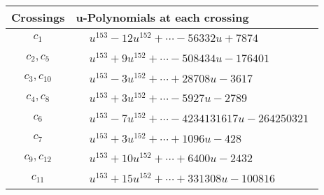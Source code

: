 \documentclass[1p]{elsarticle_modified}
\theoremstyle{definition}
\begin{document}
\begin{tabular}{m{50pt}|m{274pt}}
Crossings & \hspace{64pt}u-Polynomials at each crossing \\
\hline $$\begin{aligned}c_{1}\end{aligned}$$&$\begin{aligned}
&u^{153}-12 u^{152}+\cdots-56332 u+7874
\end{aligned}$\\
\hline $$\begin{aligned}c_{2},c_{5}\end{aligned}$$&$\begin{aligned}
&u^{153}+9 u^{152}+\cdots-508434 u-176401
\end{aligned}$\\
\hline $$\begin{aligned}c_{3},c_{10}\end{aligned}$$&$\begin{aligned}
&u^{153}-3 u^{152}+\cdots+28708 u-3617
\end{aligned}$\\
\hline $$\begin{aligned}c_{4},c_{8}\end{aligned}$$&$\begin{aligned}
&u^{153}+3 u^{152}+\cdots-5927 u-2789
\end{aligned}$\\
\hline $$\begin{aligned}c_{6}\end{aligned}$$&$\begin{aligned}
&u^{153}-7 u^{152}+\cdots-4234131617 u-264250321
\end{aligned}$\\
\hline $$\begin{aligned}c_{7}\end{aligned}$$&$\begin{aligned}
&u^{153}+3 u^{152}+\cdots+1096 u-428
\end{aligned}$\\
\hline $$\begin{aligned}c_{9},c_{12}\end{aligned}$$&$\begin{aligned}
&u^{153}+10 u^{152}+\cdots+6400 u-2432
\end{aligned}$\\
\hline $$\begin{aligned}c_{11}\end{aligned}$$&$\begin{aligned}
&u^{153}+15 u^{152}+\cdots+331308 u-100816
\end{aligned}$\\
\hline
\end{tabular}\\~\\
\end{document}
